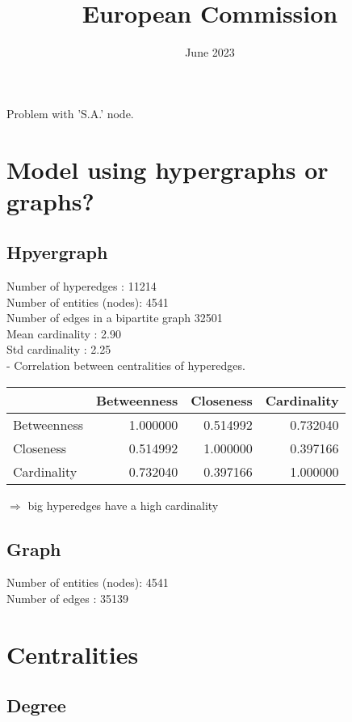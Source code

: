 \documentclass[ 11pt]{article}
\title{European Commission}
\author{}
\date{June 2023}
\begin{document}
\maketitle

Problem with 'S.A.' node. 
\section{Model using hypergraphs or graphs?}

\subsection{Hpyergraph}
Number of hyperedges : 11214\\
Number of entities (nodes): 4541\\
Number of edges in a bipartite graph 32501 \\
Mean cardinality : 2.90\\
Std cardinality : 2.25\\

- Correlation between centralities of hyperedges.\\

\begin{tabular}{lrrr}
\toprule
 & Betweenness & Closeness & Cardinality \\
\midrule
Betweenness & 1.000000 & 0.514992 & 0.732040 \\
Closeness & 0.514992 & 1.000000 & 0.397166 \\
Cardinality & 0.732040 & 0.397166 & 1.000000 \\
\bottomrule
\end{tabular}

     $\Rightarrow$  big hyperedges have a high cardinality
     
\subsection{Graph}
Number of entities (nodes): 4541\\
Number of edges : 35139 \\


\section{Centralities}
\subsection{Degree}
\end{document}
